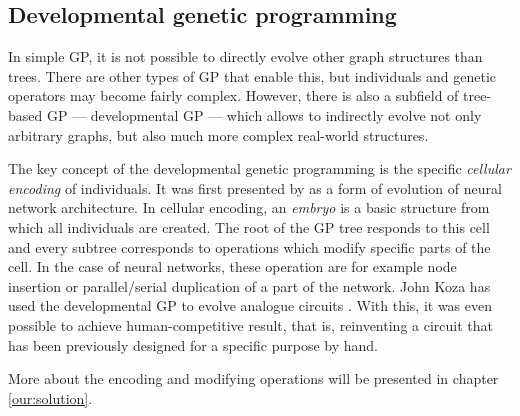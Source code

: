 \subsection{Developmental genetic programming} \label{devGP}
In simple GP, it is not possible to directly evolve other graph structures
than trees. There are other types of GP that enable this, but individuals
and genetic operators may become fairly complex. However, there is also a
subfield of tree-based GP --- developmental GP --- which allows to indirectly
evolve not only arbitrary graphs, but also much more complex real-world
structures.

The key concept of the developmental genetic programming is the
specific \emph{cellular encoding} of individuals. It was first presented by
\cite{Gruau:1994:thesis} as a form of evolution of neural network architecture.
In cellular encoding, an \emph{embryo} is a basic structure from which all
individuals are created.
The root of the GP tree responds to this cell and every subtree corresponds
to operations which modify specific parts of the cell. In the case of neural
networks, these operation are for example node insertion or parallel/serial
duplication of a part of the network. John Koza has used the developmental GP
to evolve analogue circuits \citep{Koza:1998:circuits}. With this, it was even
possible to achieve human-competitive result, that is, reinventing a circuit
that has been previously designed for a specific purpose by hand.

More about the encoding and modifying operations will be presented in
chapter \ref{our:solution}.